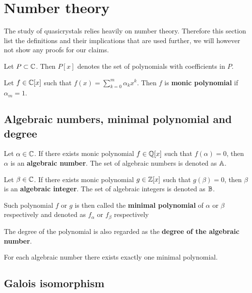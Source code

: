 \documentclass[text.tex]{subfiles}
\begin{document}
\section{Number theory}\label{sec_numberTheory} %
The study of quasicrystals relies heavily on number theory. Therefore this section list the definitions and their implications that are used further, we will however not show any proofs for our claims.
\begin{definition}
Let $P\subset\mathbb{C}$. Then $P[x]$ denotes the set of polynomials with coefficients in $P$. 
\end{definition}

\begin{definition}
Let $f\in\mathbb{C}[x]$ such that $f(x) = \sum_{k=0}^m{\alpha_kx^k}$. Then $f$ is \textbf{monic polynomial} if $\alpha_m = 1$. 
\end{definition}

\subsection{Algebraic numbers, minimal polynomial and degree}
\begin{definition}\leavevmode

\noindent
Let $\alpha\in\mathbb{C}$. If there exists monic polynomial $f\in\mathbb{Q}[x]$ such that $f(\alpha) = 0$, then $\alpha$ is an \textbf{algebraic number}. The set of algebraic numbers is denoted as $\mathbb{A}$. 

\noindent
Let $\beta\in\mathbb{C}$. If there exists monic polynomial $g\in\mathbb{Z}[x]$ such that $g(\beta) = 0$, then $\beta$ is an \textbf{algebraic integer}.  The set of algebraic integers is denoted as $\mathbb{B}$. 

Such polynomial $f$ or $g$ is then called the \textbf{minimal polynomial} of $\alpha$ or $\beta$ respectively and denoted as $f_\alpha$ or $f_\beta$ respectively

The degree of the polynomial is also regarded as the \textbf{degree of the algebraic number}. 
\end{definition}

\begin{remark}
For each algebraic number there exists exactly one minimal polynomial. 
\end{remark}

\subsection{Galois isomorphism}
\end{document}

